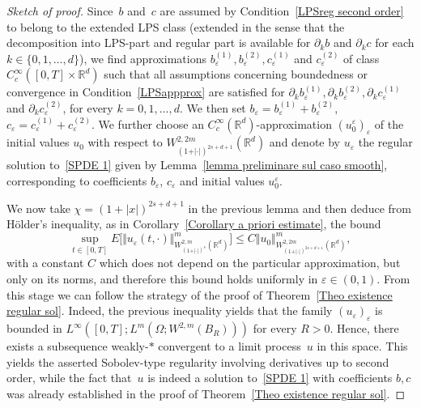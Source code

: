 \documentclass[a4paper,10pt]{article}
\newcommand\1{\mathbbm{1}}
\newcommand{\eps}{\varepsilon}
\numberwithin{equation}{section}
\begin{document}
\begin{proof}[Sketch of proof]
Since~$b$ and~$c$ are assumed by Condition~\ref{LPSreg second order} to belong to the extended LPS class (extended in the sense that the decomposition into LPS-part and regular part is available for $\partial_k b$ and $\partial_k c$ for each $k \in \{0,1,\ldots, d\}$), we find approximations $b_{\eps}^{(1)}, b_{\eps}^{(2)}, c_{\eps}^{(1)}$ and $c_{\eps}^{(2)}$ of class $C_{c}^{\infty}([0,T]\times\mathbb{R}^d)$ such that all assumptions concerning boundedness or convergence in Condition~\ref{LPSappprox} are satisfied for $\partial_k b_{\eps}^{(1)}, \partial_k b_{\eps}^{(2)}, \partial_k c_{\eps}^{(1)}$ and $\partial_k c_{\eps}^{(2)}$, for every $k=0,1,\ldots,d$. We then set  $b_{\eps}=b_{\eps}^{(1)}+b_{\eps}^{(2)}$,  $c_{\eps}=c_{\eps}^{(1)} + c_{\eps}^{(2)}$. We further choose an $C^\infty_c(\mathbb{R}^d)$-approximation $(u_0^\eps)_\eps$ of the initial values $u_0$ with respect to $W_{(1+\vert \cdot\vert )^{2s+d+1}}^{2,2m}(\mathbb{R}^{d})$ and denote by $u_{\eps}$ the regular solution to~\eqref{SPDE 1} given by Lemma~\ref{lemma preliminare sul caso smooth}, corresponding to coefficients $b_\eps$, $c_\eps$ and initial values $u_0^\eps$.

We now take $\chi = (1+|x|)^{2s+d+1}$ in the previous lemma and then deduce from H\"older's inequality, as in Corollary~\ref{Corollary a priori estimate}, the bound
\begin{equation*}
\sup_{t\in [0,T]}E \Big[ \Vert u_\eps(t,\cdot)\Vert_{W_{(1+\vert \cdot \vert)^{s}}^{2,m}(\mathbb{R}^{d})}^{m} \Big] \leq C \Vert u_{0} \Vert_{W_{(1+\vert \cdot \vert)^{2s+d+1}}^{2,2m}(\mathbb{R}^{d})}^{m},
\end{equation*}
with a constant $C$ which does not depend on the particular approximation, but only on its norms, and therefore this bound holds uniformly in $\eps \in (0,1)$. From this stage we can follow the strategy of the proof of Theorem~\ref{Theo existence regular sol}. Indeed, the previous inequality yields that the family $(u_\eps)_\eps$ is bounded in $L^\infty([0,T];L^m(\Omega;W^{2,m}(B_R)))$ for every $R>0$. Hence, there exists a subsequence weakly-$*$ convergent to a limit process~$u$ in this space. This yields the asserted Sobolev-type regularity involving derivatives up to second order, while the fact that~$u$ is indeed a solution to~\eqref{SPDE 1} with coefficients $b,c$ was already established in the proof of Theorem~\ref{Theo existence regular sol}.
\end{proof}
\end{document}
